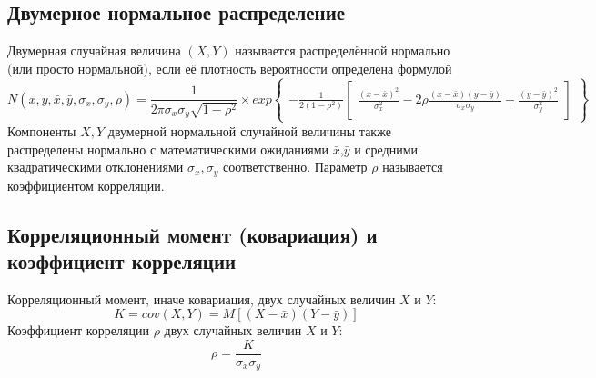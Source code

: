 \subsection{Двумерное нормальное распределение}
Двумерная случайная величина $(X,Y)$ называется распределённой нормально (или просто нормальной),
если её плотность вероятности определена формулой
\begin{equation}
N(x, y, \bar{x}, \bar{y}, \sigma_{x}, \sigma_{y}, \rho) =
\frac{1}{2\pi\sigma_{x}\sigma_{y}\sqrt{1-\rho^{2}}} \times
exp{\begin{Bmatrix}
	-\frac{1}{2(1-\rho^{2})}
	\begin{bmatrix}
	\frac{(x-\bar{x})^{2}}{\sigma_{x}^{2}} - 2\rho\frac{(x-\bar{x})(y-\bar{y})}{\sigma_{x}\sigma_{y}} + \frac{(y-\bar{y})^{2}}{\sigma_{y}^{2}}
	\end{bmatrix}
	\end{Bmatrix}}
\end{equation}
Компоненты $X,Y$ двумерной нормальной случайной величины также распределены нормально с математическими ожиданиями
$\bar{x}$,$\bar{y}$ и средними квадратическими отклонениями $\sigma_{x},\sigma_{y}$ соответственно.
Параметр $\rho$ называется коэффициентом корреляции.


\subsection{Корреляционный момент (ковариация) и коэффициент корреляции}
Корреляционный момент, иначе ковариация, двух случайных величин $X$ и $Y$:
\begin{equation}
K = cov(X, Y) = M[(X - \bar{x})(Y - \bar{y})]
\end{equation}
Коэффициент корреляции $\rho$ двух случайных величин $X$ и $Y$:
\begin{equation}
\rho = \frac{K}{\sigma_{x}\sigma_{y}}
\end{equation}
